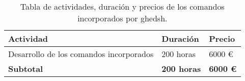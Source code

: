 \begin{table}[!ht]
\begin{center}
\begin{tabular}{|p{80mm}|p{25mm}|p{20mm}|} \hline 
\textbf{Actividad} & \textbf{Duración} & \textbf{Precio} \\ \hline

Desarrollo de los comandos incorporados &
200 horas &
6000 \euro{}
\\
\hline
\hline \hline
{\bfseries Subtotal} &
{\bfseries 200 horas} &
{\bfseries 6000 \euro{}}
\\
\hline

\end{tabular}
\end{center}
\caption{Tabla de actividades, duración y precios de los comandos incorporados por ghedsh.}
\label{table:resOthers2}
\end{table}

